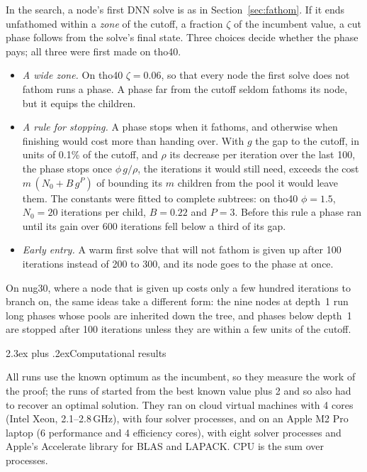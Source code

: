 \documentclass[10pt]{article}
\makeatletter
\renewcommand\section{\@startsection{section}{1}{\z@}{-3.5ex plus -1ex minus -.2ex}%
  {2.3ex plus .2ex}{\normalfont\normalsize\bfseries}}
\theoremstyle{remark}
\makeatother
\begin{document}
In the search, a node's first DNN solve is as in Section~\ref{sec:fathom}. If it
ends unfathomed within a \emph{zone} of the cutoff, a fraction $\zeta$ of the
incumbent value, a cut phase follows from the solve's final state. Three choices
decide whether the phase pays; all three were first made on tho40.
\begin{itemize}
\item \emph{A wide zone.} On tho40 $\zeta = 0.06$, so that every node the first solve
  does not fathom runs a phase. A phase far from the cutoff seldom fathoms its node,
  but it equips the children.
\item \emph{A rule for stopping.} A phase stops when it fathoms, and otherwise when
  finishing would cost more than handing over. With $g$ the gap to the cutoff, in units of 0.1\% of the cutoff, and
  $\rho$ its decrease per iteration over the last 100, the phase stops once
  $\phi\,g/\rho$, the iterations it would still need, exceeds the cost
  $m\,(N_0 + B\,g^{P})$ of bounding its $m$ children from the pool it would leave
  them. The constants were fitted to complete subtrees: on tho40 $\phi = 1.5$,
  $N_0 = 20$ iterations per child, $B = 0.22$ and $P = 3$. Before this rule a phase ran until its
  gain over 600 iterations fell below a third of its gap.
\item \emph{Early entry.} A warm first solve that will not fathom is given up after
  100 iterations instead of 200 to 300, and its node goes to the phase at once.
\end{itemize}
On nug30, where a node that is given up costs only a few hundred iterations to
branch on, the same ideas take a different form: the nine nodes at depth~1 run long
phases whose pools are inherited down the tree, and phases below depth~1 are stopped
after 100 iterations unless they are within a few units of the cutoff.

\section{Computational results}\label{sec:results}

All runs use the known optimum as the incumbent, so they measure the work of the
proof; the runs of \cite{abgl} started from the best known value plus 2 and so also
had to recover an optimal solution. They ran on cloud virtual machines with 4 cores
(Intel Xeon, 2.1--2.8\,GHz), with four solver processes, and on an Apple M2 Pro
laptop (6 performance and 4 efficiency cores), with eight solver processes and
Apple's Accelerate library for BLAS and LAPACK. CPU is the sum over
processes.
\end{document}
